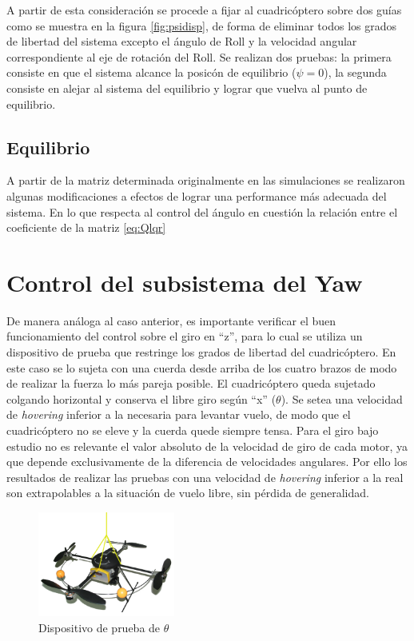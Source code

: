 \documentclass[main]{subfiles}
\begin{document}
A partir de esta consideraci\'on se procede a fijar al cuadric\'optero sobre dos gu\'ias como se muestra en la figura \ref{fig:psidisp}, de forma de eliminar todos los grados de libertad del sistema excepto el \'angulo de Roll y la velocidad angular correspondiente al eje de rotaci\'on del Roll. Se realizan dos pruebas: la primera consiste en que el sistema alcance la posic\'on de equilibrio ($\psi = 0$), la segunda consiste en alejar al sistema del equilibrio y lograr que vuelva al punto de equilibrio. 

\subsection{Equilibrio}
A partir de la matriz determinada originalmente en las simulaciones se realizaron algunas modificaciones a efectos de lograr una performance m\'as adecuada del sistema. En lo que respecta al control del \'angulo en cuesti\'on la relaci\'on entre el coeficiente de la matriz \ref{eq:Qlqr}

\section{Control del subsistema del Yaw}


De manera análoga al caso anterior, es importante verificar el buen funcionamiento del control sobre el giro en ``z'', para lo cual se utiliza un dispositivo de prueba que restringe los grados de libertad del cuadricóptero. En este caso se lo sujeta con una cuerda desde arriba de los cuatro brazos de modo de realizar la fuerza lo más pareja posible. El cuadricóptero queda sujetado colgando horizontal y conserva el libre giro según ``x'' ($\theta$).
Se setea una velocidad de \emph{hovering} inferior a la necesaria para levantar vuelo, de modo que el cuadricóptero no se eleve y la cuerda quede siempre tensa. Para el giro bajo estudio no es relevante el valor absoluto de la velocidad de giro de cada motor, ya que depende exclusivamente de la diferencia de velocidades angulares. Por ello los resultados de realizar las pruebas con una velocidad de \emph{hovering} inferior a la real son extrapolables a la situación de vuelo libre, sin pérdida de generalidad.\\

\begin{figure}
	\vspace{-20pt}
	\centering
	\includegraphics[width=0.4\textwidth]{./pics_test_control/dispositivo_theta.pdf}
	\caption{Dispositivo de prueba de $\theta$}
	\label{fig:thetadisp}
\end{figure}
\end{document}
